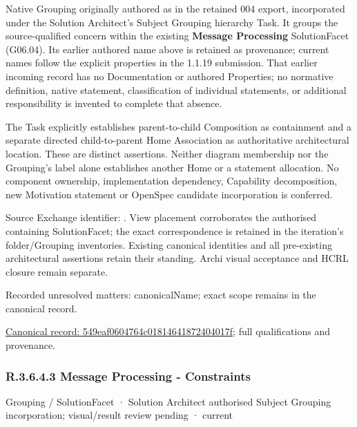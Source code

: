 Native Grouping originally authored as \texttt{} in the retained 004 export,
incorporated under the Solution Architect's Subject Grouping hierarchy Task.
It groups the source-qualified \texttt{} concern within
the existing \textbf{Message Processing} SolutionFacet (G06.04). Its earlier authored name above is retained as provenance; current names
follow the explicit properties in the 1.1.19 submission.
That earlier incoming record has no Documentation or authored Properties; no normative
definition, native statement, classification of individual statements, or
additional responsibility is invented to complete that absence.



The Task explicitly establishes parent-to-child Composition as containment and
a separate directed child-to-parent Home Association as authoritative architectural
location. These are distinct assertions. Neither diagram membership nor the
Grouping's label alone establishes another Home or a statement allocation.
No component ownership, implementation dependency, Capability decomposition,
new Motivation statement or OpenSpec candidate incorporation is conferred.



Source Exchange identifier: \texttt{}. View placement corroborates
the authorised containing SolutionFacet; the exact correspondence is retained in the
iteration's folder/Grouping inventories. Existing canonical identities and all
pre-existing architectural assertions retain their standing. Archi visual
acceptance and HCRL closure remain separate.


{\small Recorded unresolved matters: canonicalName; exact scope remains in the canonical record.}\par
{\footnotesize \href{../../../../../../../continuum/grouping/549eaf0604764c01814641872404017f.md}{Canonical record: 549eaf0604764c01814641872404017f}; full qualifications and provenance.}\par
\subsubsection*{R.3.6.4.3 Message Processing - Constraints}
\label{navigation:R.3.6.4.3}

\label{element:99e7cebde18640df841ac7f5c0c996be}
{\small Grouping / SolutionFacet · Solution Architect authorised Subject Grouping incorporation; visual/result review pending · current}\par

